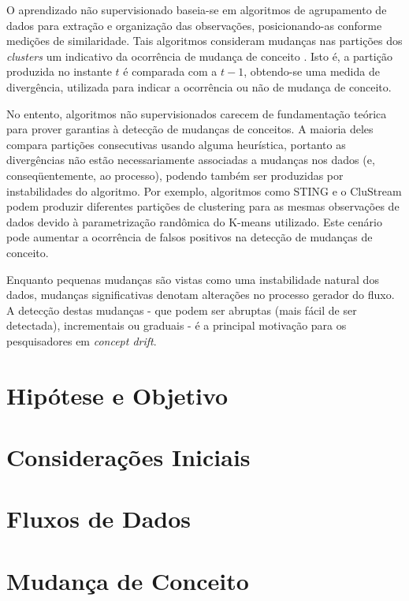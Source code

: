 \documentclass[qual, classic, a4paper]{ufbathesis}
\begin{document}
O aprendizado não supervisionado baseia-se em algoritmos de agrupamento de dados para extração e organização das observações, posicionando-as conforme medições de similaridade. Tais algoritmos consideram mudanças nas partições dos \textit{clusters} um indicativo da ocorrência de mudança de conceito \cite{Aggarwal:2003:FCE:1315451.1315460}.
Isto é, a partição produzida no instante $t$ é comparada com a $t - 1$, obtendo-se uma medida de divergência, utilizada para indicar a ocorrência ou não de mudança de conceito. 

No entento, algoritmos não supervisionados carecem de fundamentação teórica para prover garantias à detecção de mudanças de conceitos. A maioria deles compara partições consecutivas usando alguma heurística, portanto as divergências não estão necessariamente associadas a mudanças nos dados (e, conseqüentemente, ao processo), podendo também ser produzidas por instabilidades do algoritmo. Por exemplo, algoritmos como STING \cite{Wang:1997:SSI:645923.758369} e o CluStream \cite{Aggarwal:2003:FCE:1315451.1315460} podem produzir diferentes partições de clustering para as mesmas observações de dados devido à parametrização randômica do K-means utilizado. Este cenário pode aumentar a ocorrência de falsos positivos na detecção de mudanças de conceito. 

Enquanto pequenas mudanças são vistas como uma instabilidade natural dos dados, mudanças significativas denotam alterações no processo gerador do fluxo. A detecção destas mudanças - que podem ser abruptas (mais fácil de ser detectada),  incrementais ou graduais \cite{Tsymbal04theproblem} - é a principal motivação para os pesquisadores em \textit{concept drift}.


\section{Hipótese e Objetivo}
\blindtext

 \label{revisao_bibliografica}
\section{Considerações Iniciais}
\blindtext

\section{Fluxos de Dados}
\blindtext

\section{Mudança de Conceito}
\blindtext
\end{document}
